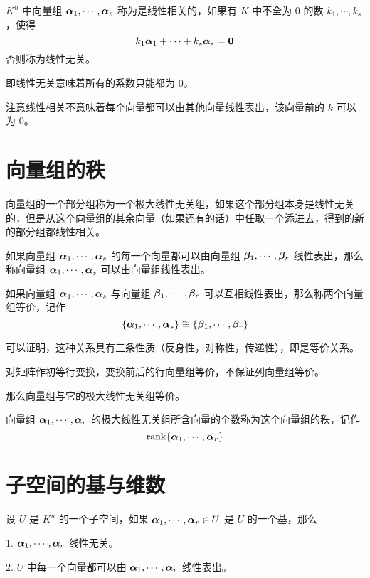 \begin{definition}
	$K^n$ 中向量组 $\boldsymbol{\alpha}_1,\cdots,\boldsymbol{\alpha}_s$ 称为是线性相关的，如果有 $K$ 中不全为 $0$ 的数 $k_1,\cdots,k_s$，使得
	$$k_1\boldsymbol{\alpha}_1+\cdots+k_s\boldsymbol{\alpha}_s=\boldsymbol{0}$$
	否则称为线性无关。
\end{definition}

即线性无关意味着所有的系数只能都为 $0$。

注意线性相关不意味着每个向量都可以由其他向量线性表出，该向量前的 $k$ 可以为 $0$。

\section{向量组的秩}

\begin{definition}[极大线性无关组]
	向量组的一个部分组称为一个极大线性无关组，如果这个部分组本身是线性无关的，但是从这个向量组的其余向量（如果还有的话）中任取一个添进去，得到的新的部分组都线性相关。
\end{definition}

如果向量组 $\boldsymbol{\alpha}_1,\cdots,\boldsymbol{\alpha}_s$ 的每一个向量都可以由向量组 $\boldsymbol{\beta}_1,\cdots,\boldsymbol{\beta}_r$ 线性表出，那么称向量组 $\boldsymbol{\alpha}_1,\cdots,\boldsymbol{\alpha}_s$ 可以由向量组线性表出。

\begin{definition}
	如果向量组 $\boldsymbol{\alpha}_1,\cdots,\boldsymbol{\alpha}_s$ 与向量组 $\boldsymbol{\beta}_1,\cdots,\boldsymbol{\beta}_r$ 可以互相线性表出，那么称两个向量组等价，记作
	$$\{\boldsymbol{\alpha}_1,\cdots,\boldsymbol{\alpha}_s\} \cong \{\boldsymbol{\beta}_1,\cdots,\boldsymbol{\beta}_r\}$$
\end{definition}

可以证明，这种关系具有三条性质（反身性，对称性，传递性），即是等价关系。

对矩阵作初等行变换，变换前后的行向量组等价，不保证列向量组等价。

那么向量组与它的极大线性无关组等价。

\begin{definition}
	向量组 $\boldsymbol{\alpha}_1,\cdots,\boldsymbol{\alpha}_r$ 的极大线性无关组所含向量的个数称为这个向量组的秩，记作
	$$\operatorname{rank}\{\boldsymbol{\alpha}_1,\cdots,\boldsymbol{\alpha}_r\}$$
\end{definition}

\section{子空间的基与维数}

\begin{definition}
	设 $U$ 是 $K^n$ 的一个子空间，如果 $\boldsymbol{\alpha}_1,\cdots,\boldsymbol{\alpha}_r\in U$ 是 $U$ 的一个基，那么

	1. $\boldsymbol{\alpha}_1,\cdots,\boldsymbol{\alpha}_r$ 线性无关。

	2. $U$ 中每一个向量都可以由 $\boldsymbol{\alpha}_1,\cdots,\boldsymbol{\alpha}_r$ 线性表出。
\end{definition}


